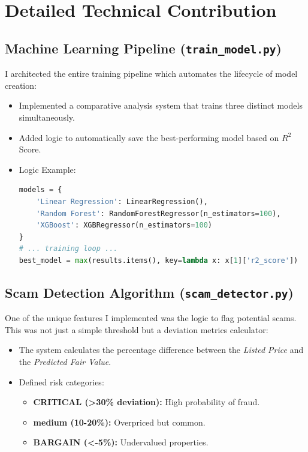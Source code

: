 \documentclass[12pt, a4paper]{article}
\begin{document}
\section{Detailed Technical Contribution}

\subsection{Machine Learning Pipeline (\texttt{train\_model.py})}
I architected the entire training pipeline which automates the lifecycle of model creation:
\begin{itemize}
    \item Implemented a comparative analysis system that trains three distinct models simultaneously.
    \item Added logic to automatically save the best-performing model based on $R^2$ Score.
    \item Logic Example:
    \begin{lstlisting}[language=Python]
models = {
    'Linear Regression': LinearRegression(),
    'Random Forest': RandomForestRegressor(n_estimators=100),
    'XGBoost': XGBRegressor(n_estimators=100)
}
# ... training loop ...
best_model = max(results.items(), key=lambda x: x[1]['r2_score'])
    \end{lstlisting}
\end{itemize}

\subsection{Scam Detection Algorithm (\texttt{scam\_detector.py})}
One of the unique features I implemented was the logic to flag potential scams. This was not just a simple threshold but a deviation metrics calculator:
\begin{itemize}
    \item The system calculates the percentage difference between the \textit{Listed Price} and the \textit{Predicted Fair Value}.
    \item Defined risk categories:
    \begin{itemize}
        \item \textbf{CRITICAL (>30\% deviation):} High probability of fraud.
        \item \textbf{medium (10-20\%):} Overpriced but common.
        \item \textbf{BARGAIN (<-5\%):} Undervalued properties.
    \end{itemize}
\end{itemize}
\end{document}

